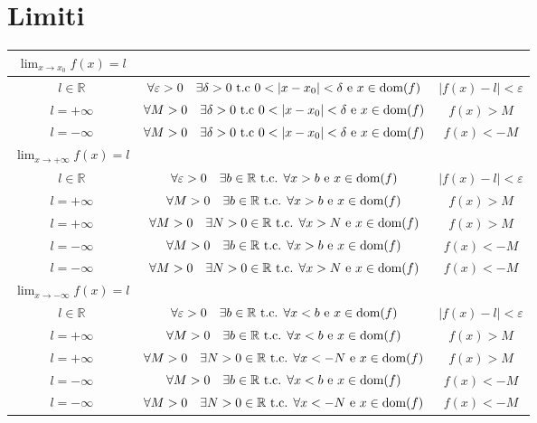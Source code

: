 \documentclass[12pt, a4paper]{report}
\begin{document}
    \section{Limiti}
    \begin{center}
        \begin{tabular}{|c|c|c|}
            \hline
            $\lim_{x\to x_{0}}f(x)=l$ & &\\
            \hline
            $l\in \mathbb{R}$ & $\forall\varepsilon>0\quad\exists\delta>0\text{ t.c }0<|x-x_{0}|<\delta \text{ e } x\in\dom{f}$ & $|f(x)-l|<\varepsilon$\\
            \hline
            $l=+\infty$ & $\forall M>0\quad\exists\delta>0\text{ t.c }0<|x-x_{0}|<\delta \text{ e } x\in\dom{f}$ & $f(x)>M$\\
            \hline
            $l=-\infty$ & $\forall M>0\quad\exists\delta>0\text{ t.c }0<|x-x_{0}|<\delta \text{ e } x\in\dom{f}$ & $f(x)<-M$\\
            \hline
            $\lim_{x\to +\infty}f(x)=l$ & &\\
            \hline
            $l\in \mathbb{R}$ & $\forall \varepsilon>0\quad\exists b\in\mathbb{R} \text{ t.c. } \forall x>b \text{ e }x\in\text{dom}(f)$ & $|f(x)-l|<\varepsilon$\\
            \hline
            $l=+\infty$ & $\forall M>0\quad\exists b\in\mathbb{R} \text{ t.c. } \forall x>b \text{ e }x\in\text{dom}(f)$ & $f(x)>M$\\
            \hline
            $l=+\infty$ & $\forall M>0\quad\exists N>0\in\mathbb{R} \text{ t.c. } \forall x>N \text{ e }x\in\text{dom}(f)$ & $f(x)>M$\\
            \hline
            $l=-\infty$ & $\forall M>0\quad\exists b\in\mathbb{R} \text{ t.c. } \forall x>b \text{ e }x\in\text{dom}(f)$ & $f(x)<-M$\\
            \hline
            $l=-\infty$ & $\forall M>0\quad\exists N>0\in\mathbb{R} \text{ t.c. } \forall x>N \text{ e }x\in\text{dom}(f)$ & $f(x)<-M$\\
            \hline
            $\lim_{x\to -\infty}f(x)=l$ & &\\
            \hline
            $l\in \mathbb{R}$ & $\forall \varepsilon>0\quad\exists b\in\mathbb{R} \text{ t.c. } \forall x<b \text{ e }x\in\text{dom}(f)$ & $|f(x)-l|<\varepsilon$\\
            \hline
            $l=+\infty$ & $\forall M>0\quad\exists b\in\mathbb{R} \text{ t.c. } \forall x<b \text{ e }x\in\text{dom}(f)$ & $f(x)>M$\\
            \hline
            $l=+\infty$ & $\forall M>0\quad\exists N>0\in\mathbb{R} \text{ t.c. } \forall x<-N \text{ e }x\in\text{dom}(f)$ & $f(x)>M$\\
            \hline
            $l=-\infty$ & $\forall M>0\quad\exists b\in\mathbb{R} \text{ t.c. } \forall x<b \text{ e }x\in\text{dom}(f)$ & $f(x)<-M$\\
            \hline
            $l=-\infty$ & $\forall M>0\quad\exists N>0\in\mathbb{R} \text{ t.c. } \forall x<-N \text{ e }x\in\text{dom}(f)$ & $f(x)<-M$\\
            \hline
        \end{tabular}
    \end{center}
\end{document}
